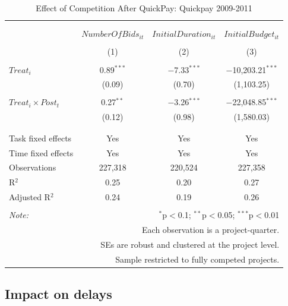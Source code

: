 \documentclass[
]{article}
\begin{document}
\begin{table}[H] \centering 
  \caption{Effect of Competition After QuickPay: Quickpay 2009-2011} 
  \label{} 
\small 
\begin{tabular}{@{\extracolsep{0pt}}lccc} 
\\[-1.8ex]\hline 
\hline \\[-1.8ex] 
\\[-1.8ex] & $NumberOfBids_{it}$ & $InitialDuration_{it}$ & $InitialBudget_{it}$ \\ 
\\[-1.8ex] & (1) & (2) & (3)\\ 
\hline \\[-1.8ex] 
 $Treat_i$ & 0.89$^{***}$ & $-$7.33$^{***}$ & $-$10,203.21$^{***}$ \\ 
  & (0.09) & (0.70) & (1,103.25) \\ 
  & & & \\ 
 $Treat_i \times Post_t$ & 0.27$^{**}$ & $-$3.26$^{***}$ & $-$22,048.85$^{***}$ \\ 
  & (0.12) & (0.98) & (1,580.03) \\ 
  & & & \\ 
\hline \\[-1.8ex] 
Task fixed effects & Yes & Yes & Yes \\ 
Time fixed effects & Yes & Yes & Yes \\ 
Observations & 227,318 & 220,524 & 227,358 \\ 
R$^{2}$ & 0.25 & 0.20 & 0.27 \\ 
Adjusted R$^{2}$ & 0.24 & 0.19 & 0.26 \\ 
\hline 
\hline \\[-1.8ex] 
\textit{Note:}  & \multicolumn{3}{r}{$^{*}$p$<$0.1; $^{**}$p$<$0.05; $^{***}$p$<$0.01} \\ 
 & \multicolumn{3}{r}{Each observation is a project-quarter.} \\ 
 & \multicolumn{3}{r}{SEs are robust and clustered at the project level.} \\ 
 & \multicolumn{3}{r}{Sample restricted to fully competed projects.} \\ 
\end{tabular} 
\end{table}

\hypertarget{impact-on-delays}{%
\subsection{Impact on delays}\label{impact-on-delays}}
\end{document}
